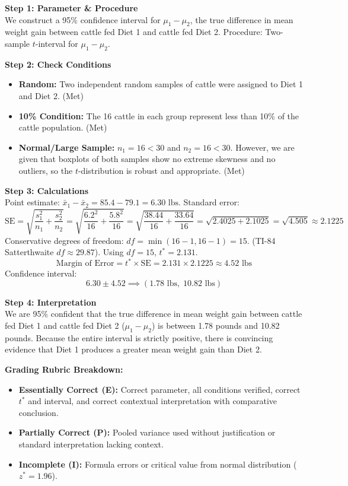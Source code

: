 \begin{frqrubricbox}
\textbf{Step 1: Parameter \& Procedure}\\
We construct a 95\% confidence interval for $\mu_1 - \mu_2$, the true difference in mean weight gain between cattle fed Diet 1 and cattle fed Diet 2. Procedure: Two-sample $t$-interval for $\mu_1 - \mu_2$.

\textbf{Step 2: Check Conditions}\\
\begin{itemize}
  \item \textbf{Random:} Two independent random samples of cattle were assigned to Diet 1 and Diet 2. (Met)
  \item \textbf{10\% Condition:} The 16 cattle in each group represent less than 10\% of the cattle population. (Met)
  \item \textbf{Normal/Large Sample:} $n_1 = 16 < 30$ and $n_2 = 16 < 30$. However, we are given that boxplots of both samples show no extreme skewness and no outliers, so the $t$-distribution is robust and appropriate. (Met)
\end{itemize}

\textbf{Step 3: Calculations}\\
Point estimate: $\bar{x}_1 - \bar{x}_2 = 85.4 - 79.1 = 6.30\text{ lbs}$.
Standard error:
\[ \text{SE} = \sqrt{\frac{s_1^2}{n_1} + \frac{s_2^2}{n_2}} = \sqrt{\frac{6.2^2}{16} + \frac{5.8^2}{16}} = \sqrt{\frac{38.44}{16} + \frac{33.64}{16}} = \sqrt{2.4025 + 2.1025} = \sqrt{4.505} \approx 2.1225 \]
Conservative degrees of freedom: $df = \min(16-1, 16-1) = 15$. (TI-84 Satterthwaite $df \approx 29.87$).
Using $df = 15$, $t^* = 2.131$.
\[ \text{Margin of Error} = t^* \times \text{SE} = 2.131 \times 2.1225 \approx 4.52\text{ lbs} \]
Confidence interval:
\[ 6.30 \pm 4.52 \implies (1.78\text{ lbs}, \; 10.82\text{ lbs}) \]

\textbf{Step 4: Interpretation}\\
We are 95\% confident that the true difference in mean weight gain between cattle fed Diet 1 and cattle fed Diet 2 ($\mu_1 - \mu_2$) is between 1.78 pounds and 10.82 pounds. Because the entire interval is strictly positive, there is convincing evidence that Diet 1 produces a greater mean weight gain than Diet 2.

\textbf{Grading Rubric Breakdown:}\\
\begin{itemize}
  \item \textbf{Essentially Correct (E):} Correct parameter, all conditions verified, correct $t^*$ and interval, and correct contextual interpretation with comparative conclusion.
  \item \textbf{Partially Correct (P):} Pooled variance used without justification or standard interpretation lacking context.
  \item \textbf{Incomplete (I):} Formula errors or critical value from normal distribution ($z^* = 1.96$).
\end{itemize}
\end{frqrubricbox}

